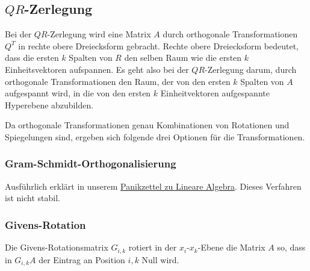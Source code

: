 \documentclass{panikzettel}
\begin{document}
\subsection[QR-Zerlegung]{$QR$-Zerlegung}

Bei der $QR$-Zerlegung wird eine Matrix $A$ durch orthogonale Transformationen $Q^T$ in rechte obere Dreiecksform gebracht. Rechte obere Dreiecksform bedeutet, dass die ersten $k$ Spalten von $R$ den selben Raum wie die ersten $k$ Einheitsvektoren aufspannen. Es geht also bei der $QR$-Zerlegung darum, durch orthogonale Transformationen den Raum, der von den ersten $k$ Spalten von $A$ aufgespannt wird, in die von den ersten $k$ Einheitvektoren aufgespannte Hyperebene abzubilden.

Da orthogonale Transformationen genau Kombinationen von Rotationen und Spiegelungen sind, ergeben sich folgende drei Optionen für die Transformationen.

\subsubsection{Gram-Schmidt-Orthogonalisierung}

Ausführlich erklärt in unserem \href{http://panikzettel.philworld.de/la.pdf#page=20}{Panikzettel zu Lineare Algebra}. Dieses Verfahren ist nicht stabil.

\subsubsection{Givens-Rotation}

Die Givens-Rotationsmatrix $G_{i,k}$ rotiert in der $x_i$-$x_k$-Ebene die Matrix $A$ so, dass in $G_{i,k} A$ der Eintrag an Position $i, k$ Null wird.
\end{document}
